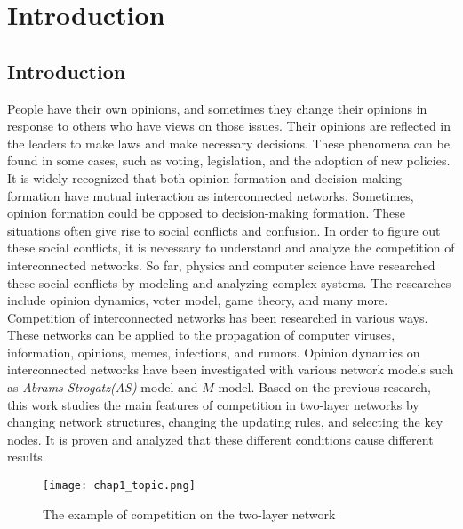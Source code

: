 
\chapter{Introduction}
\label{chap1}
\section{Introduction}
People have their own opinions, and sometimes they change their opinions in response to others who have views on those issues. Their opinions are reflected in the leaders to make laws and make necessary decisions. These phenomena can be found in some cases, such as voting, legislation, and the adoption of new policies. It is widely recognized that both opinion formation and decision-making formation have mutual interaction as interconnected networks\parencite{mikko2014, danziger2019, newman2010, boccaletti2014, domenico2013, tomasini2015, namkhanhvu2017}. Sometimes, opinion formation could be opposed to decision-making formation. These situations often give rise to social conflicts and confusion. In order to figure out these social conflicts, it is necessary to understand and analyze the competition of interconnected networks. So far, physics and computer science have researched these social conflicts by modeling and analyzing complex systems\parencite{fangwu2004, zuev2012, laguna2004, masuda2014}. The researches include opinion dynamics\parencite{amato2017, haibo2017, amato2017, quattrociocchi2014}, voter model\parencite{redner2017, casey2009}, game theory\parencite{smyrnakis2019}, and many more\parencite{bianconi2018}. 
Competition of interconnected networks has been researched in various ways. These networks can be applied to the propagation of computer viruses\parencite{serazzi2003}, information\parencite{hua2014}, opinions\parencite{alvarez2016, gomez2015,diep2017,rocca2014, velasquez2018}, memes\parencite{massad2013}, infections\parencite{shenyu2018, zhou2018}, and rumors\parencite{liu2018}. Opinion dynamics on interconnected networks have been investigated with various network models such as \textit{Abrams-Strogatz(AS)} model\parencite{abrams2003,vazquez2010} and $M$ model\parencite{rocca2014}.  Based on the previous research, this work studies the main features of competition in two-layer networks by changing network structures, changing the updating rules, and selecting the key nodes. It is proven and analyzed that these different conditions cause different results.
\begin{figure}[!htb]
	\centering
	\texttt{[image: chap1\_topic.png]}
	\caption{The example of competition on the two-layer network}
	\label{chap1_topic}
\end{figure}

